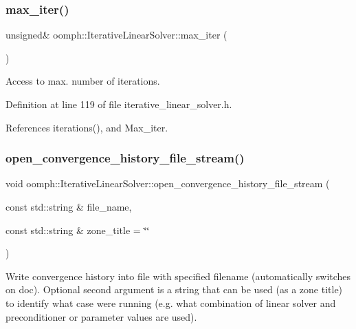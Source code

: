 \subsubsection{\texorpdfstring{max\+\_\+iter()}{max\_iter()}}
{\footnotesize\ttfamily unsigned\& oomph\+::\+Iterative\+Linear\+Solver\+::max\+\_\+iter (\begin{DoxyParamCaption}{ }\end{DoxyParamCaption})\hspace{0.3cm}{\ttfamily [inline]}}



Access to max. number of iterations. 



Definition at line 119 of file iterative\+\_\+linear\+\_\+solver.\+h.



References iterations(), and Max\+\_\+iter.

\mbox{\label{classoomph_1_1IterativeLinearSolver_a1c5e176ff2c767f2dc2168f9789f9c8f}} 
\subsubsection{\texorpdfstring{open\+\_\+convergence\+\_\+history\+\_\+file\+\_\+stream()}{open\_convergence\_history\_file\_stream()}}
{\footnotesize\ttfamily void oomph\+::\+Iterative\+Linear\+Solver\+::open\+\_\+convergence\+\_\+history\+\_\+file\+\_\+stream (\begin{DoxyParamCaption}\item[{const std\+::string \&}]{file\+\_\+name,  }\item[{const std\+::string \&}]{zone\+\_\+title = {\ttfamily \char`\"{}\char`\"{}} }\end{DoxyParamCaption})\hspace{0.3cm}{\ttfamily [inline]}}



Write convergence history into file with specified filename (automatically switches on doc). Optional second argument is a string that can be used (as a zone title) to identify what case we\textquotesingle{}re running (e.\+g. what combination of linear solver and preconditioner or parameter values are used). 



